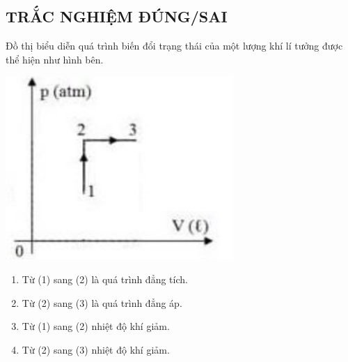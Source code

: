 \subsection{TRẮC NGHIỆM ĐÚNG/SAI}
\setcounter{ex}{0}
\begin{ex}
	Đồ thị biểu diễn quá trình biến đổi trạng thái của một lượng khí lí tưởng được thể hiện như hình bên.
	\begin{center}
		\includegraphics[width=0.25\linewidth]{figs/VN12-Y24-PH-SYL-014P-15}
	\end{center}
	\begin{enumerate}[label=\alph*)]
		\item Từ (1) sang (2) là quá trình đẳng tích.
		\item Từ (2) sang (3) là quá trình đẳng áp.
		\item  Từ (1) sang (2) nhiệt độ khí giảm.
		\item Từ (2) sang (3) nhiệt độ khí giảm.
	\end{enumerate}
\end{ex}
